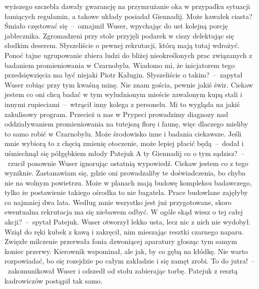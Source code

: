 \documentclass[../MAIN.tex]{subfiles}
\begin{document}
wyższego szczebla dawały gwarancję na przymrużanie oka w
przypadku sytuacji łamiących regulamin, a takowe układy
posiadał Giennadij.
%
\sx Może kawałek ciasta? Śmiało częstować się~--~oznajmił
Wuser, wpychając do ust kolejną porcję jabłecznika.
Zgromadzeni przy stole przyjęli podarek w ciszy delektując się
słodkim deserem.
\xx Słyszeliście o pewnej rekrutacji, którą mają tutaj wdrożyć.
Ponoć tajne ugrupowanie zbiera ludzi do bliżej nieokreślonych
prac związanych z badaniem promieniowania w Czarnobylu. Wiadomo
mi, że inicjatorem tego przedsięwzięcia ma być niejaki Piotr
Kaługin. Słyszeliście o takim?~--~zapytał Wuser robiąc przy tym
kwaśną minę.
\xx Nie znam gościa, pewnie jakiś świr. Ciekaw jestem co oni
chcą badać w tym wyludnionym mieście zawalonym kupą stali i
innymi rupieciami~--~wtrącił inny kolega z personelu.
\xx Mi to wygląda na jakiś zakulisowy program. Przecież u nas w
Prypeci prowadzimy diagnozy nad oddziaływaniem promieniowania
na tutejszą florę i faunę, więc dlaczego mieliby to samo robić
w Czarnobylu. Może środowisko inne i badania ciekawsze. Jeśli
mnie wybiorą to z chęcią zmienię otoczenie, może lepiej płacić
będą~--~dodał i uśmiechnął się półgębkiem młody Patejuk
\xx A ty Giennadij co o tym sądzisz?~--~rzucił ponownie Wuser
ignorując ostatnią wypowiedź.
\xx Ciekaw jestem co z tego wyniknie. Zastanawiam się, gdzie
oni prowadzaliby te doświadczenia, bo chyba nie na wolnym
powietrzu. Może w planach mają budowę kompleksu badawczego,
tylko że postawienie takiego ośrodka to nie bagatela. Prace
budowlane zajęłyby co najmniej dwa lata.
\xx Według mnie wszystko jest już przygotowane, skoro
ewentualna rekrutacja ma się niebawem odbyć. W ogóle skąd wiesz
o tej całej akcji?~--~spytał Patejuk.
\qd
Wuser otworzył lekko usta, lecz nic z nich nie wydobył. Wziął
do ręki kubek z kawą i zakręcił, nim mieszając resztki czarnego
naparu. Zwięzłe milczenie przerwała fonia dzwoniącej aparatury
głosząc tym samym koniec przerwy.
\sx Kierownik wspominał, ale jak, by co gębą na kłódkę. Nie
warto rozpowiadać, bo się rozejdzie po całym zakładzie i się
zamęt zrobi. To do jutra!~--~zakomunikował Wuser i odszedł od
stołu zabierając torbę.
\qd
Patejuk z resztą kadrowiczów postąpił tak samo.
\end{document}
